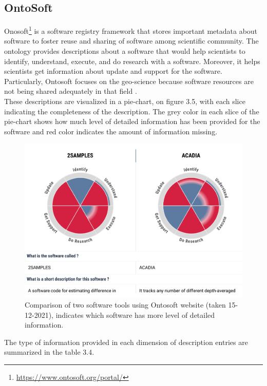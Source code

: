 \subsection{OntoSoft}
\label{subsec:purpose:ontologies:OntoSoft}
Onosoft\footnote{\url{https://www.ontosoft.org/portal/}} is a software registry framework that stores important metadata about software to foster reuse and sharing of software among scientific community. The ontology provides descriptions about a software that would help scientists to identify, understand, execute, and do research with a software. Moreover, it helps scientists get information about update and support for the software. Particularly, Ontosoft focuses on the geo-science because software resources are not being shared adequately in that field \citep{gil2015ontosoft}.\\ 

These descriptions are visualized in a pie-chart, on figure 3.5, with each slice indicating the completeness of the description.  The grey color in each slice of the pie-chart shows how much level of detailed information has been provided for the software and red color indicates the amount of information missing. 


\begin{figure}[htbp]
	\centering
	\includegraphics[width=.90\textwidth]{4.graphics/figures/ch_3/ontosoft}
	\caption{Comparison of two software tools using Ontosoft website (taken 15-12-2021), indicates which software has more level of detailed information.}
	\label{fig:chapter03:setup}
\end{figure} 

The type of information provided in each dimension of description entries are  summarized in the table 3.4. \\

